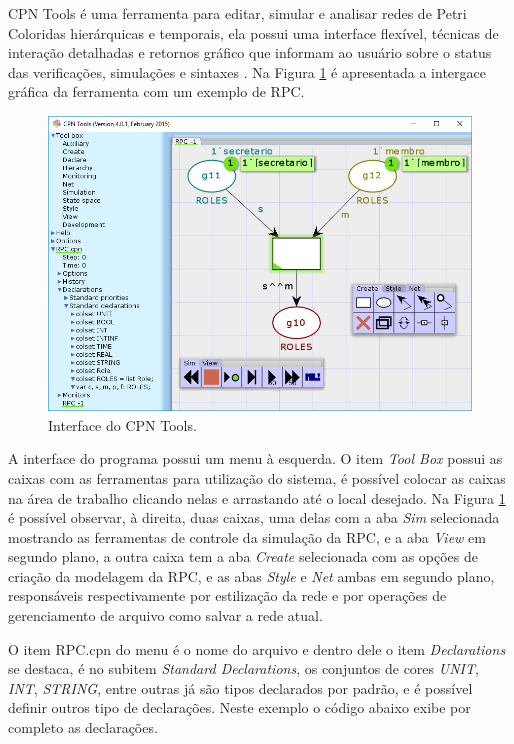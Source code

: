 CPN Tools é uma ferramenta para editar, simular e analisar redes de Petri Coloridas hierárquicas e temporais, ela possui uma interface flexível, técnicas de interação detalhadas e retornos gráfico que informam ao usuário sobre o status das verificações, simulações e sintaxes \cite{ratzer2003cpn}. Na Figura \ref{fig:cpn} é apresentada a intergace gráfica da ferramenta com um exemplo de RPC.

\begin{figure}[ht]
\centering
\includegraphics[scale=0.7]{imagens/2-cpn.png}
\caption{Interface do CPN Tools.}
\label{fig:cpn}
\end{figure}

A interface do programa possui um menu à esquerda. O item \textit{Tool Box} possui as caixas com as ferramentas para utilização do sistema, é possível colocar as caixas na área de trabalho clicando nelas e arrastando até o local desejado. Na Figura \ref{fig:cpn} é possível observar, à direita, duas caixas, uma delas com a aba \textit{Sim} selecionada mostrando as ferramentas de controle da simulação da RPC, e a aba \textit{View} em segundo plano, a outra caixa tem a aba \textit{Create} selecionada com as opções de criação da modelagem da RPC, e as abas \textit{Style} e \textit{Net} ambas em segundo plano, responsáveis  respectivamente por estilização da rede e por operações de gerenciamento de arquivo como salvar a rede atual.

O item RPC.cpn do menu é o nome do arquivo e dentro dele o item \textit{Declarations} se destaca, é no subitem \textit{Standard Declarations}, os conjuntos de cores \textit{UNIT}, \textit{INT}, \textit{STRING}, entre outras já são tipos declarados por padrão, e é possível definir outros tipo de declarações. Neste exemplo o código abaixo exibe por completo as declarações.

